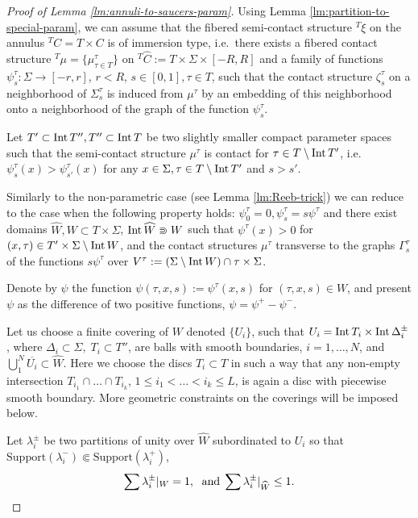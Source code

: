 \documentclass[12pt]{paper}
\theoremstyle{plain}
\theoremstyle{definition}
\newcommand{\wh}{\widehat}
\newcommand{\Int}{{\rm Int\,}} %
\newcommand{\Supp}{\mathrm{Support}}
\numberwithin{figure}{section}
\begin{document}
 \begin{proof}[Proof of Lemma \ref{lm:annuli-to-saucers-param}]
Using Lemma \ref{lm:partition-to-special-param}, we can assume that the fibered
 semi-contact structure ${}^T\xi$ on the annulus 
    ${}^TC=T\times C$ is of immersion type, 
    i.e.\ there exists a fibered contact structure 
    ${}^T \mu=\{\mu^\tau_{\tau\in T}\}$ 
    on ${}^T\wh C:=T\times\Sigma\times[-R,R]$ and a family of functions  
    $\psi^\tau_s:\Sigma\to[- r,r]$, $r<R$,
    $s\in[0,1], \tau\in T$, such that the contact structure $\zeta^\tau_s$  on a neighborhood of $\Sigma^\tau _s$ is induced from 
    $\mu^\tau$ by an embedding of this neighborhood onto a neighborhood of the graph of the function $\psi^\tau_s$. 
    
     Let $T'\subset\Int T'', T''\subset \Int T$   be two slightly smaller  compact parameter spaces such that the semi-contact structure $\mu^\tau$ is contact for $\tau\in T\setminus\Int T'$, i.e.\ $\psi^\tau_s(x)>\psi^\tau_{s'}(x)$ for any $x\in\Sigma, \tau\in T\setminus\Int T'$ and $s>s'$.

Similarly to the non-parametric case (see Lemma \ref{lm:Reeb-trick}) we can  reduce to the case when
the following property holds: $\psi^\tau_0=0,\psi^\tau_s=s\psi^\tau$ and 
there exist    domains $\wh W, W \subset T\times\Sigma$, $\Int \wh W\Supset W$ such that $\psi^\tau(x)>0$ for $(x,\tau)\in
T'\times\Sigma\setminus\Int W$, and the contact structures $\mu^\tau$ transverse to the graphs $\Gamma^\tau_s $ of the functions
$s\psi^\tau$ over $V^\tau:=(\Sigma\setminus\Int W)\cap{\tau\times\Sigma}$.

 Denote by $\psi$ the function $\psi(\tau,x,s):=\psi^\tau(x,s)$ for $(\tau,x,s)\in W$, and present $\psi$   as the difference of two positive functions, $\psi=\psi^+-\psi^-$. 
 
 
 
  
 
  Let us choose a  finite covering  of $ W$ denoted $\{U_i\}$, 
 such that  $U_i=\Int T_i\times \Int\Delta^\pm_i $,
  where $\Delta_i\subset\Sigma,\; T_i\subset T''$, are  balls with smooth boundaries, $ i=1,\dots, N$, and  $\bigcup\limits_1^N \overline{U_i}\subset \wh W$. Here   we  choose the discs $T_i\subset T$ in such a way that any non-empty intersection $T_{i_1}\cap\dots\cap T_{i_k}$, $1\leq i_1<\dots<i_k\leq L$, is again a disc with piecewise smooth boundary.  More geometric constraints on the coverings will be imposed below.
  
  Let $\lambda^\pm_i$ be two  partitions   of unity over $\wh W$ subordinated to  $U_i$ so that $\Supp(\lambda_i^-)\Subset\Supp(\lambda_i^+)$, 
     $$\sum\lambda^\pm_i|_{ W}=1,\;\hbox{ and} \; \sum\lambda^\pm_i|_{\wh W}\leq 1.$$



\end{proof}
\end{document}

